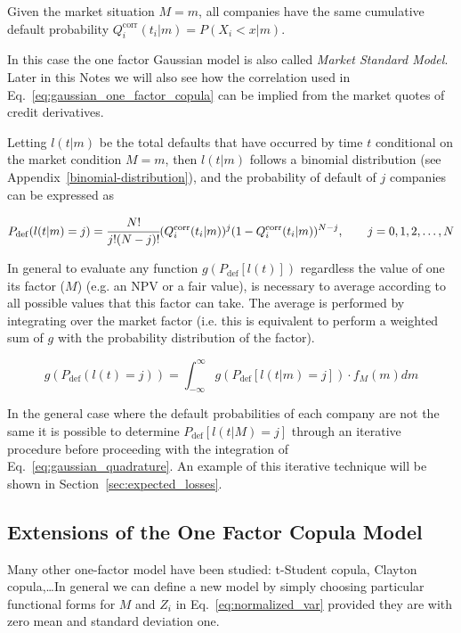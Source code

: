 Given the market situation \(M = m\), all companies have the same cumulative default probability \(Q_i^{\textrm{corr}}(t_i|m)=P(X_i < x|m)\). 

In this case the one factor Gaussian model is also called \emph{Market Standard Model}. Later in this Notes we will also see how the correlation used in Eq.~\ref{eq:gaussian_one_factor_copula} can be implied from the market quotes of credit derivatives.

Letting \(l(t|m)\) be the total defaults that have occurred by time \(t\) conditional on the market condition \(M = m\), then \(l(t|m)\) follows a binomial distribution (see Appendix~\ref{binomial-distribution}), and the probability of default of $j$ companies can be expressed as

\begin{equation}
P_{\mathrm{def}}(l(t|m) = j) = \cfrac{N!}{j!(N-j)!}(Q_i^{\textrm{corr}}(t_i|m))^j(1-Q_i^{\textrm{corr}}(t_i|m))^{N-j},\qquad  j=0, 1, 2,\ldots,N
\end{equation}

In general to evaluate any function $g(P_{\mathrm{def}}[l(t)])$ regardless the value of one its factor ($M$) (e.g. an NPV or a fair value), is necessary to average according to all possible values that this factor can take. The average is performed by integrating over the market factor (i.e. this is equivalent to perform a weighted sum of $g$ with the probability distribution of the factor).  

\begin{equation}
g(P_{\mathrm{def}}(l(t) = j)) = \int_{-\infty}^{\infty}{g(P_{\mathrm{def}}[l(t|m) = j])\cdot f_M(m)dm}
\label{eq:gaussian_quadrature}
\end{equation}

In the general case where the default probabilities of each company are not the same it is possible to determine $P_{\mathrm{def}}[l(t|M)=j]$ through an iterative procedure before proceeding with the integration of Eq.~\ref{eq:gaussian_quadrature}. An example of this iterative technique will be shown in Section~\ref{sec:expected_losses}.

\subsection{Extensions of the One Factor Copula Model}
Many other one-factor model have been studied: t-Student copula, Clayton copula,\ldots In general we can define a new model by simply choosing particular functional forms for $M$ and $Z_i$ in Eq.~\ref{eq:normalized_var} provided they are with zero mean and standard deviation one. 

